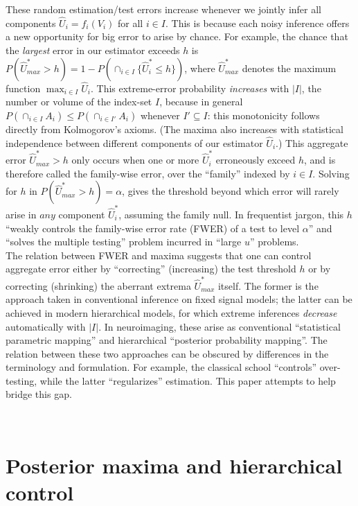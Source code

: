 \documentclass{article}
\begin{document}
{{These random estimation/test errors increase whenever we jointly infer all components $\hat{U}_i=f_i(V_i)$ for all $i \in I$. This is because each noisy inference offers a new opportunity for big error to arise by chance. For example, the chance that the \textit{largest} error in our estimator exceeds $h$ is $P(\hat{U}_{max}^* > h) = 1-P(\cap_{i \in I} \{ \hat{U}_i^* \leq h \})$, where $\hat{U}_{max}^*$ denotes the maximum function $\max_{i \in I} \hat{U}_i$. This extreme-error probability \textit{increases} with $|I|$, the number or volume of the index-set $I$, because in general $P(\cap_{i \in  I} A_i) \leq P(\cap_{i \in  I'} A_i)$ whenever $I' \subseteq I$: this monotonicity follows directly from Kolmogorov's axioms.  (The maxima also increases with statistical independence between different components of our estimator $\hat{U}_i$.) This aggregate error $\hat{U}_{max}^*>h$ only occurs when one or more $\hat{U}_i^*$ erroneously exceed $h$, and is therefore called the family-wise error, over the ``family'' indexed by $i \in I$. Solving for $h$ in $P(\hat{U}_{max}^* > h) = \alpha$, gives the threshold beyond which error will rarely arise in $any$ component $\hat{U}_i^*$, assuming the family null. In frequentist jargon, this $h$ ``weakly controls the family-wise error rate (FWER) of a test to level $\alpha$'' and ``solves the multiple testing'' problem incurred in ``large $u$'' problems. \\

The relation between FWER and maxima suggests that one can control aggregate error either by ``correcting'' (increasing) the test threshold $h$ or by correcting (shrinking) the aberrant extrema $\hat{U}_{max}^*$ itself. The former is the approach taken in conventional inference on fixed signal models; the latter can be achieved in modern hierarchical models, for which extreme inferences \textit{decrease} automatically with $|I|$. In neuroimaging, these arise as conventional ``statistical parametric mapping'' and hierarchical ``posterior probability mapping''. The relation between these two approaches can be obscured by differences in the terminology and formulation. For example, the classical school ``controls'' over-testing, while the latter ``regularizes'' estimation. This paper attempts to help bridge this gap. 

}
}\\

\section{Posterior maxima and hierarchical control}
\end{document}
